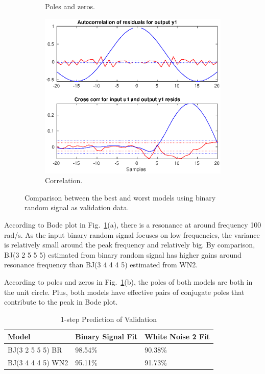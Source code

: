 \documentclass[10pt,a4paper]{article}
\begin{document}
\begin{figure}[ht]
\begin{subfigure}[t]{.32\linewidth}
		\caption{Poles and zeros.}
		\end{subfigure}
		\begin{subfigure}[t]{.32\linewidth}
		\centering\includegraphics[width=\linewidth]{binaryResiduals.eps}
		\caption{Correlation.}
  		\end{subfigure}
  		\caption{Comparison between the best and worst models using binary random signal as validation data.}
  		\label{fig:binaryCompare}
  	\end{figure}
\par According to Bode plot in Fig.~\ref{fig:binaryCompare}(a), there is a resonance at around frequency 100 rad/s. As the input binary random signal focuses on low frequencies, the variance is relatively small around the peak frequency and relatively big. By comparison, BJ(3 2 5 5 5) estimated from binary random signal has higher gains around resonance frequency than BJ(3 4 4 4 5) estimated from WN2.
\par According to poles and zeros in Fig.~\ref{fig:binaryCompare}(b), the poles of both models are both in the unit circle. Plus, both models have effective pairs of conjugate poles that contribute to the peak in Bode plot.
	\begin{table}[ht]
		\footnotesize
		\centering
		\caption{1-step Prediction of Validation}
		\label{table:binaryValidation}
		\begin{tabular}{lll}
			\hline
			Model & \textbf{Binary Signal Fit} & White Noise 2 Fit \\
			\hline
			BJ(3 2 5 5 5) BR & 98.54\% & 90.38\% \\
			BJ(3 4 4 4 5) WN2 & 95.11\% & 91.73\% \\
			\hline
		\end{tabular}
	\end{table}
\end{document}

